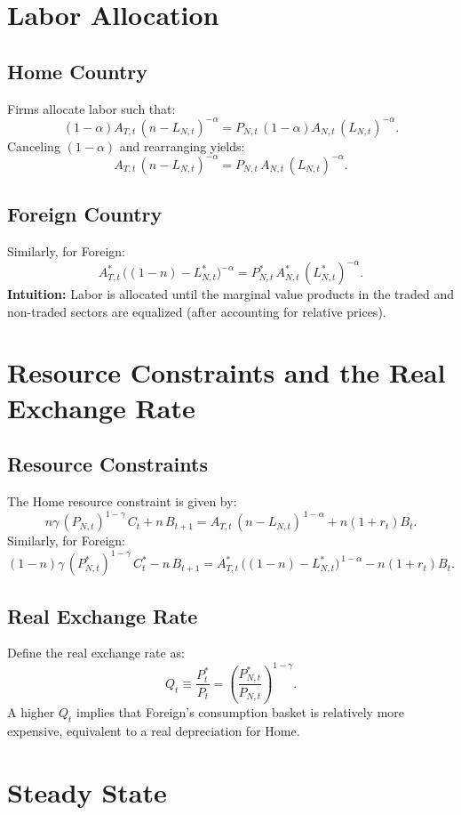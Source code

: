\documentclass[a4paper,12pt]{article} %
\theoremstyle{nonitalic}
\begin{document}
\section{Labor Allocation}

\subsection*{Home Country}
Firms allocate labor such that:
\[
(1-\alpha)A_{T,t}\,(n-L_{N,t})^{-\alpha} = P_{N,t}\,(1-\alpha)A_{N,t}\,(L_{N,t})^{-\alpha}.
\]
Canceling \( (1-\alpha) \) and rearranging yields:
\[
\boxed{A_{T,t}\,(n-L_{N,t})^{-\alpha} = P_{N,t}\,A_{N,t}\,(L_{N,t})^{-\alpha}.}
\]

\subsection*{Foreign Country}
Similarly, for Foreign:
\[
\boxed{A^*_{T,t}\,\big((1-n)-L^*_{N,t}\big)^{-\alpha} = P^*_{N,t}\,A^*_{N,t}\,(L^*_{N,t})^{-\alpha}.}
\]
\textbf{Intuition:} Labor is allocated until the marginal value products in the traded and non-traded sectors are equalized (after accounting for relative prices).

\section{Resource Constraints and the Real Exchange Rate}

\subsection*{Resource Constraints}
The Home resource constraint is given by:
\[
n\gamma\,(P_{N,t})^{1-\gamma}\,C_t + n\,B_{t+1} = A_{T,t}\,(n-L_{N,t})^{\,1-\alpha} + n(1+r_t)B_t.
\]
Similarly, for Foreign:
\[
(1-n)\gamma\,(P^*_{N,t})^{1-\gamma}\,C^*_t - n\,B_{t+1} = A^*_{T,t}\,\big((1-n)-L^*_{N,t}\big)^{\,1-\alpha} - n(1+r_t)B_t.
\]

\subsection*{Real Exchange Rate}
Define the real exchange rate as:
\[
Q_t \equiv \frac{P^*_t}{P_t} = \left(\frac{P^*_{N,t}}{P_{N,t}}\right)^{1-\gamma}.
\]
A higher \( Q_t \) implies that Foreign’s consumption basket is relatively more expensive, equivalent to a real depreciation for Home.

\section{Steady State}
\end{document}
